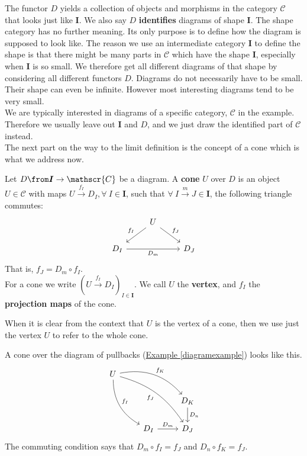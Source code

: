 The functor $D$ yields
a collection of objects and morphisms in the category $\mathscr C$
that looks just like $\bm I$.
We also say $D$ \textbf{identifies} diagrams of shape $\bm I$.
The shape category has no further meaning. Its only purpose
is to define how the diagram is supposed to look like.
The reason we use an intermediate
category $\bm I$ to define the shape is that
there might be many parts in $\mathscr C$ which have the shape $\bm I$,
especially when $\bm I$ is so small.
We therefore get all different diagrams of that shape by considering
all different functors $D$.
Diagrams do not necessarily have to be small. Their shape can even be infinite.
However most interesting diagrams tend to be very small.\\
We are typically interested in diagrams of a specific category,
$\mathscr C$ in the example. Therefore we usually leave out $\bm I$ and $D$,
and we just draw the identified part of $\mathscr C$ instead.\\
The next part on the way to the limit definition is the concept of a cone which
is what we address now.
\begin{definition}
  Let $D \from \bm{I} \to \mathscr{C}$ be a diagram.
  A \textbf{cone} $U$ over $D$ is an object $U \in \mathscr{C}$
  with maps $U \overset{f_I}{\rightarrow} D_I, \forall\ I \in \bm{I}$, such that
  $\forall\ I \overset{m}{\to} J \in \bm{I}$, the following triangle commutes:
  \[
    \begin{tikzcd}
      & U \arrow[dl, swap, "f_I"] \arrow{dr}{f_J}&\\
      D_I \arrow[rr, swap, "D_m"] & & D_J
    \end{tikzcd}
  \]
  That is, $f_J = D_m \circ f_I$.\\
  For a cone we write $(U \overset{f_I}{\to} D_I)_{I\in \bm{I}}$.
  We call $U$ the \textbf{vertex}, and $f_I$ the \textbf{projection maps} of the cone.
\end{definition}
\begin{remark}
  When it is clear from the context that $U$ is the vertex of a cone, then we use just
  the vertex $U$ to refer to the whole cone.
\end{remark}
\begin{example}
  A cone over the diagram of pullbacks
  (\hyperref[diagramexample]{Example \ref*{diagramexample}}) looks like this.
  \[
    \begin{tikzcd}
      U \arrow[bend right=30]{ddr}{f_I} \arrow[bend left=30]{drr}{f_K} \arrow[bend left=20, swap]{ddrr}{f_J}&   &\\
      & & D_K \arrow{d}{D_n} \\
      & D_I \arrow{r}{D_m} & D_J
    \end{tikzcd}
  \]
  The commuting condition says that $D_m \circ f_I = f_J$ and $D_n \circ f_K = f_J$.
\end{example}

